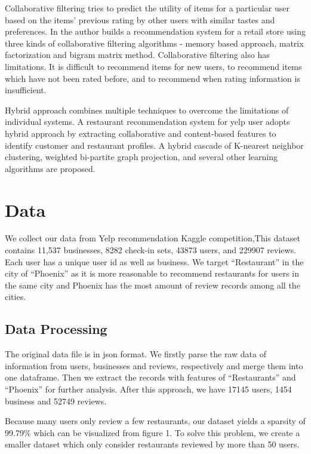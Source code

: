 \documentclass{llncs}
\begin{document}
Collaborative filtering tries to predict the utility of items for a particular user based on the items’ previous rating by other users with similar tastes and preferences. In\cite{Bruno} the author builds a recommendation system for a retail store using three kinds of collaborative filtering algorithms - memory based approach, matrix factorization and bigram matrix method. Collaborative filtering also has limitations. It is difficult to recommend items for new users, to recommend items which have not been rated before, and to recommend when rating information is insufficient. 

Hybrid approach combines multiple techniques to overcome the limitations of individual systems. A restaurant recommendation system for yelp user\cite{Sumedh} adopts hybrid approach by extracting collaborative and content-based features to identify customer and restaurant profiles. A hybrid cascade of K-nearest neighbor clustering, weighted bi-partite graph projection, and several other learning algorithms are proposed. 

\section{Data}
We collect our data from Yelp recommendation Kaggle competition\cite{yelp},This dataset contains 11,537 businesses, 8282 check-in sets, 43873 users, and 229907 reviews. Each user has a unique user id as well as business. We target ``Restaurant'' in the city of ``Phoenix'' as it is more reasonable to recommend restaurants for users in the same city and Phoenix has the most amount of review records among all the cities.
\subsection{ Data Processing}
The original data file is in json format. We firstly parse the raw data of information from users, businesses and reviews, respectively and merge them into one dataframe. Then we extract the records with features of “Restaurants” and “Phoenix” for further analysis. After this approach, we have 17145 users, 1454 business and 52749 reviews.

Because many users only review a few restaurants, our dataset yields a sparsity of 99.79\% which can be visualized from figure 1. To solve this problem, we create a smaller dataset which only consider  restaurants reviewed by more than 50 users.
%
\end{document}
